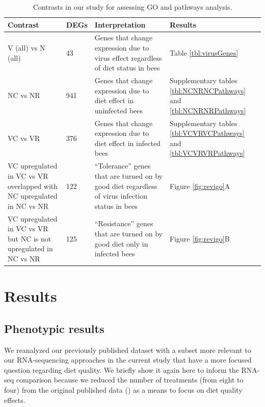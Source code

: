 \documentclass[11pt,a4paper,oldfontcommands,openany]{memoir}
\numberwithin{equation}{section} %
\begin{document}
\begin{table}[H]
\begin{tabular}{ | m{4.4cm} | m{0.9cm}| m{5.5cm} | m{2.6cm} | } 
\hline
Contrast & DEGs & Interpretation & Results \\ 
\hline
V (all) vs N (all) & 43 & Genes that change expression due to virus effect regardless of diet status in bees & Table \ref{tbl:virusGenes} \\ 
\hline
NC vs NR & 941 & Genes that change expression due to diet effect in uninfected bees & Supplementary tables \ref{tbl:NCNRNCPathways} and \ref{tbl:NCNRNRPathways} \\ 
\hline
VC vs VR & 376 & Genes that change expression due to diet effect in infected bees & Supplementary tables \ref{tbl:VCVRVCPathways} and \ref{tbl:VCVRVRPathways} \\ 
\hline
VC upregulated in VC vs VR overlapped with NC upregulated in NC vs NR & 122 & ``Tolerance'' genes that are turned on by good diet regardless of virus infection status in bees & Figure \ref{fig:revigo}A \\
\hline
VC upregulated in VC vs VR but NC is not upregulated in NC vs NR & 125 & ``Resistance'' genes that are turned on by good diet only in infected bees & Figure \ref{fig:revigo}B \\
\hline
\end{tabular}
\caption{Contrasts in our study for assessing GO and pathways analysis.}
  \label{tbl:contrasts}
\end{table}


\section{Results}

\subsection{Phenotypic results}

We reanalyzed our previously published dataset with a subset more relevant to our RNA-sequencing approaches in the current study that have a more focused question regarding diet quality. We briefly show it again here to inform the RNA-seq comparison because we reduced the number of treatments (from eight to four) from the original published data (\citealt{adamInt}) as a means to focus on diet quality effects.
\end{document}
